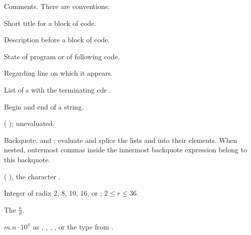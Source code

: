 \begin{LIST}{1cm}

  {
    Comments. There are conventions:
  }
  \begin{LIST}{.5cm}
    {Short title for a block of code.}
    
    {Description before a block of code.}
    
    {State of program or of following code.}
    
    {Regarding line on which it appears.}
    
  \end{LIST}
  
  {
    List of s with the terminating cdr .
  }
  
  {
    Begin and end of a string.
  }

  {
    ( );  unevaluated.
  }

  {
    Backquote.   and ; evaluate 
    and splice the lists  and  into their
    elements. When nested, outermost commas inside the innermost
    backquote expression belong to this backquote.
  }

  {
    ( ), the character .
  }

  {%
    Integer of radix 2, 8, 10, 16, or ; $2\le r \le 36$.
  }

  {
    The  $\frac{n}{d}$.
  }

  {
    $m.n\cdot10^x$ as , ,
    , , or the type from .
  }


\end{LIST}
